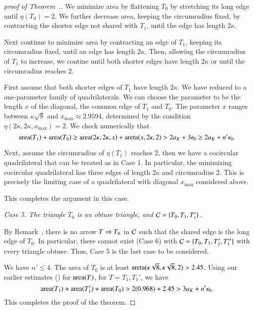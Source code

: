 \begin{proof}[proof of Theorem~.]
We minimize area by flattening $T_0$ by stretching its long edge until
$\eta(T_0)=2$.  We further decrease area, keeping the circumradius
fixed, by contracting the shorter edge not shared with $T_1$, until
the edge has length $2\kappa$.

Next continue to minimize area by contracting an edge of $T_1$,
keeping its circumradius fixed, until an edge has length $2\kappa$.
Then, allowing the circumradius of $T_1$ to increase, we contine until
both shorter edges have length $2\kappa$ or until the circumradius
reaches $2$.

First assume that both shorter edges of $T_1$ have length $2\kappa$.
We have reduced to a one-parameter family of quadrilaterals.  We can
choose the parameter to be the length $x$ of the diagonal, the common
edge of $T_1$ and $T_0$.  The parameter $x$ ranges between
$\kappa\sqrt{8}$ and $x_{\max}\approx 2.9594$, determined by the
condition $\eta(2\kappa,2\kappa,x_{\max}) = 2$.  We check numerically
that
\[
{\operatorname{area}}(T_1) + {\operatorname{area}}(T_0) \ge {\operatorname{area}}(2\kappa,2\kappa,x) +
{\operatorname{areta}}(x,2\kappa,2) > 2a_K + 3 \epsilon_0 \ge 2a_K + n'\epsilon_0.
\] %

Next, assume the circumradius of $\eta(T_1)$ reaches $2$, then we
have a cocircular quadrilateral that can be treated as in Case 1.  In
particular, the minimizing cocircular quadrilateral has three edges of
length $2\kappa$ and circumradius $2$.  This is precisely the limiting
case of a quadrilateral with diagonal $x_{\max}$ considered above.

This completes the argument in this case.

{\it Case 5. The triangle $T_0$ is an obtuse triangle, and $\mathcal C=\{T_0,T_1,T_1'\}$.}  

By Remark~, there is no arrow $T \Rightarrow T_0$ in $\mathcal C$
such that the shared edge is the long edge of $T_0$.  In particular,
there cannot exist (Case 6) with $\mathcal C=\{T_0,T_1,T_1',T_1''\}$ with
every triangle obtuse.  Thus, Case 5 is the last case to be
considered.

We have $n'\le 4$.
The area of $T_0$ is at least
${\operatorname{areta}}(\kappa\sqrt{8},\kappa\sqrt{8},2) > 2.45$.  
Using our earlier estimates ()
for ${\operatorname{area}}(T)$, for $T=T_1,T_1'$, we
have
\[
{\operatorname{area}}(T_1) + {\operatorname{area}}(T_1') + {\operatorname{area}}(T_0) > 2 (0.968) + 2.45 > 3a_K + n'\epsilon_0.
\] %
This completes the proof of the theorem.
\end{proof}


